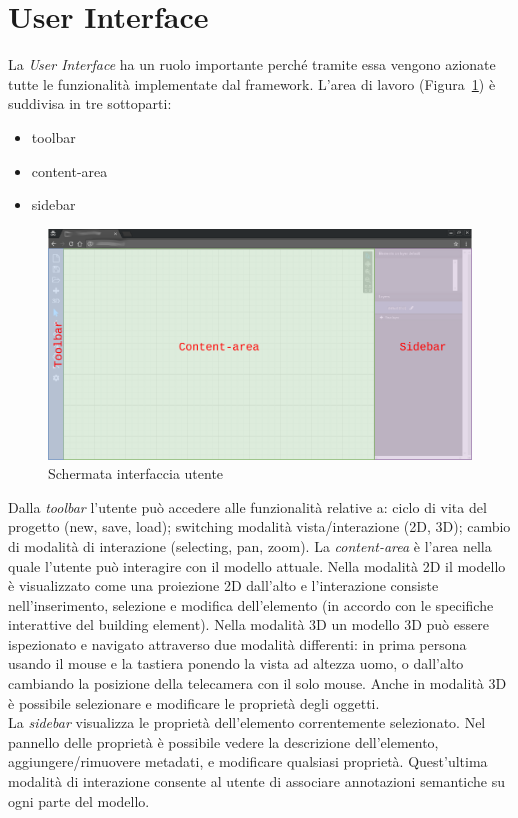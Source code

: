 \section{User Interface}
\label{sec:chapter_2_section_2}

La \emph{User Interface} ha un ruolo importante perché tramite essa vengono azionate tutte le funzionalità
implementate dal framework. L'area di lavoro (Figura~\ref{fig:interfaccia}) è suddivisa in tre sottoparti:
\begin{itemize}
  \item toolbar
  \item content-area
  \item sidebar
\end{itemize}

\begin{figure}[htbp] %
   \centering
   \includegraphics[width=1\linewidth]{images/mock-interfaccia}
   \caption{Schermata interfaccia utente}
   \label{fig:interfaccia}
\end{figure}

Dalla \emph{toolbar} l'utente pu\`o accedere alle funzionalit\`a relative a: ciclo di vita del progetto (new, save, load);
switching modalità vista/interazione (2D, 3D); cambio di modalità di interazione (selecting, pan, zoom).
\newpage
La \emph{content-area} \`e l'area nella quale l'utente pu\`o interagire con il modello attuale. Nella modalit\`a 2D
il modello \`e visualizzato come una proiezione 2D dall'alto e l'interazione consiste nell'inserimento, selezione e modifica
dell'elemento (in accordo con le specifiche interattive del building element). Nella modalità 3D un modello 3D pu\`o essere
ispezionato e navigato attraverso due modalità differenti: in prima persona usando il mouse e la tastiera ponendo la vista
ad altezza uomo, o dall'alto cambiando la posizione della telecamera con il solo mouse. Anche in modalità 3D è possibile
selezionare e modificare le proprietà degli oggetti.\\
\indent
La \emph{sidebar} visualizza le propriet\`a dell'elemento correntemente selezionato. Nel pannello delle propriet\`a \`e possibile
vedere la descrizione dell'elemento, aggiungere/rimuovere metadati, e modificare qualsiasi propriet\`a.
Quest'ultima modalità di interazione consente al utente di associare annotazioni semantiche su ogni parte del modello.
\newpage

